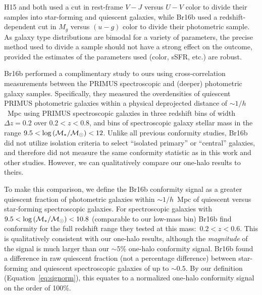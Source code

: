 H15 and \citet{Kawinwanichakij16} both used a cut in rest-frame ${V-J}$ versus ${U-V}$ color to divide their samples into star-forming and quiescent galaxies, while Br16b used a redshift-dependent cut in $M_g$ versus ${(u-g)}$ color to divide their photometric sample.
As galaxy type distributions are bimodal for a variety of parameters, the precise method used to divide a sample should not have a strong effect on the outcome, provided the estimates of the parameters used (color, sSFR, etc.) are robust.

Br16b performed a complimentary study to ours using 
cross-correlation measurements between the PRIMUS spectroscopic and (deeper) photometric galaxy samples.
Specifically, they measured the overdensities of quiescent PRIMUS photometric galaxies within a physical deprojected distance of $\sim1/h$~Mpc using PRIMUS spectroscopic galaxies in three redshift bins of width ${\Delta z=0.2}$ over ${0.2<z<0.8}$, 
and bins of spectroscopic galaxy stellar mass in the range ${9.5<\logM<12}$.
Unlike all previous conformity studies, Br16b did not utilize isolation criteria to select ``isolated primary'' or ``central'' galaxies, and therefore did not measure the same conformity statistic as in this work and other studies.
However, we can qualitatively compare our one-halo results to theirs.

To make this comparison, we define the Br16b conformity signal as a greater quiescent fraction of photometric galaxies within $\sim1/h$~Mpc of quiescent versus star-forming spectroscopic galaxies.
For spectroscopic galaxies with ${9.5 < \logM < 10.8}$ (comparable to our low-mass bin) Br16b find conformity for the full redshift range they tested at this mass:~${0.2<z<0.6}$.
This is qualitatively consistent with our one-halo results, although the \emph{magnitude} of the signal is much larger than our $\sim5$\% one-halo conformity signal.
Br16b found a difference in raw quiescent fraction (not a percentage difference) between star-forming and quiescent spectroscopic galaxies of up to $\sim0.5$.
By our definition (Equation~\ref{eq:signorm}), this equates to a normalized one-halo conformity signal on the order of 100\%.

